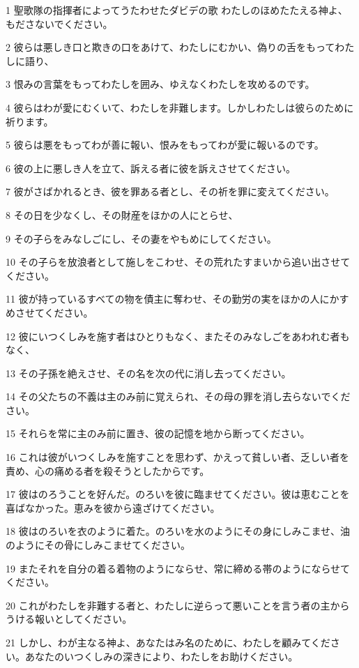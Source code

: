 \par 1 聖歌隊の指揮者によってうたわせたダビデの歌 わたしのほめたたえる神よ、もださないでください。
\par 2 彼らは悪しき口と欺きの口をあけて、わたしにむかい、偽りの舌をもってわたしに語り、
\par 3 恨みの言葉をもってわたしを囲み、ゆえなくわたしを攻めるのです。
\par 4 彼らはわが愛にむくいて、わたしを非難します。しかしわたしは彼らのために祈ります。
\par 5 彼らは悪をもってわが善に報い、恨みをもってわが愛に報いるのです。
\par 6 彼の上に悪しき人を立て、訴える者に彼を訴えさせてください。
\par 7 彼がさばかれるとき、彼を罪ある者とし、その祈を罪に変えてください。
\par 8 その日を少なくし、その財産をほかの人にとらせ、
\par 9 その子らをみなしごにし、その妻をやもめにしてください。
\par 10 その子らを放浪者として施しをこわせ、その荒れたすまいから追い出させてください。
\par 11 彼が持っているすべての物を債主に奪わせ、その勤労の実をほかの人にかすめさせてください。
\par 12 彼にいつくしみを施す者はひとりもなく、またそのみなしごをあわれむ者もなく、
\par 13 その子孫を絶えさせ、その名を次の代に消し去ってください。
\par 14 その父たちの不義は主のみ前に覚えられ、その母の罪を消し去らないでください。
\par 15 それらを常に主のみ前に置き、彼の記憶を地から断ってください。
\par 16 これは彼がいつくしみを施すことを思わず、かえって貧しい者、乏しい者を責め、心の痛める者を殺そうとしたからです。
\par 17 彼はのろうことを好んだ。のろいを彼に臨ませてください。彼は恵むことを喜ばなかった。恵みを彼から遠ざけてください。
\par 18 彼はのろいを衣のように着た。のろいを水のようにその身にしみこませ、油のようにその骨にしみこませてください。
\par 19 またそれを自分の着る着物のようにならせ、常に締める帯のようにならせてください。
\par 20 これがわたしを非難する者と、わたしに逆らって悪いことを言う者の主からうける報いとしてください。
\par 21 しかし、わが主なる神よ、あなたはみ名のために、わたしを顧みてください。あなたのいつくしみの深きにより、わたしをお助けください。
